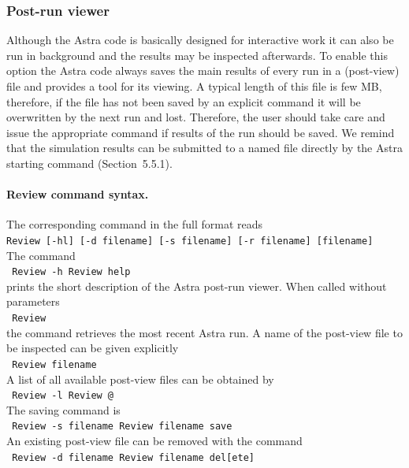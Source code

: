 \subsubsection{Post-run viewer}

Although the Astra code is basically designed for interactive work it
can also be run in background and the results may be inspected
afterwards. 
To enable this option the Astra code always saves the main results of
every run in a (post-view) file and provides a tool for its viewing.
A typical length of this file is few MB, therefore, if the file has not
been saved by an explicit command it will be overwritten by the next run
and lost. 
Therefore, the user should take care and issue the appropriate command if
results of the run should be saved. 
We remind that the simulation results can be submitted to a named file
directly by the Astra starting command (Section~5.5.1).

\paragraph{Review command syntax.}
The corresponding command in the full format reads
\\{\indent
\tt Review [-hl] [-d file\us name] [-s file\us name] [-r file\us name] 
		[file\us name]}
\\
The command 
\\{\tt\indent
Review -h
\hspace{40mm}{\rm or}\qq\qq
Review help}
\\
prints the short description of the Astra post-run viewer.
When called without parameters
\\{\tt\indent
Review}
\\
the command retrieves the most recent Astra run.
A name of the post-view file to be inspected can be given explicitly
\\{\tt\indent
Review file\us name}
\\
A list of all available post-view files can be obtained by
\\{\tt\indent
Review -l
\hspace{40mm}{\rm or}\qq\qq
Review @}
\\
The saving command is 
\\{\tt\indent
Review -s file\us name
\qq{}\qq\qq
Review file\us name save}
\\
An existing post-view file can be removed with the command
\\{\tt\indent
Review -d file\us name
\qq{}\qq\qq
Review file\us name del[ete]}

